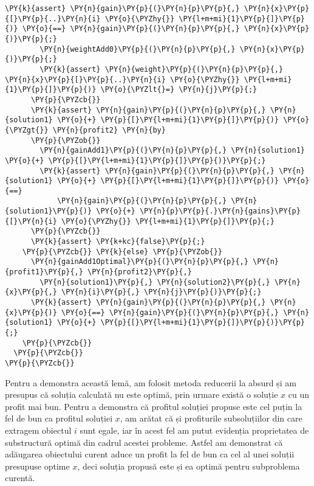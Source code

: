 \begin{sloppypar}
\begin{Verbatim}[commandchars=\\\{\}]
        \PY{k}{assert} \PY{n}{gain}\PY{p}{(}\PY{n}{p}\PY{p}{,} \PY{n}{x}\PY{p}{[}\PY{p}{..}\PY{n}{i} \PY{o}{\PYZhy{}} \PY{l+m+mi}{1}\PY{p}{]}\PY{p}{)} \PY{o}{==} \PY{n}{gain}\PY{p}{(}\PY{n}{p}\PY{p}{,} \PY{n}{x}\PY{p}{)}\PY{p}{;}
        \PY{n}{weightAdd0}\PY{p}{(}\PY{n}{p}\PY{p}{,} \PY{n}{x}\PY{p}{)}\PY{p}{;}
        \PY{k}{assert} \PY{n}{weight}\PY{p}{(}\PY{n}{p}\PY{p}{,} \PY{n}{x}\PY{p}{[}\PY{p}{..}\PY{n}{i} \PY{o}{\PYZhy{}} \PY{l+m+mi}{1}\PY{p}{]}\PY{p}{)} \PY{o}{\PYZlt{}=} \PY{n}{j}\PY{p}{;}
      \PY{p}{\PYZcb{}}
      \PY{k}{assert} \PY{n}{gain}\PY{p}{(}\PY{n}{p}\PY{p}{,} \PY{n}{solution1} \PY{o}{+} \PY{p}{[}\PY{l+m+mi}{1}\PY{p}{]}\PY{p}{)} \PY{o}{\PYZgt{}} \PY{n}{profit2} \PY{n}{by} 
      \PY{p}{\PYZob{}}
        \PY{n}{gainAdd1}\PY{p}{(}\PY{n}{p}\PY{p}{,} \PY{n}{solution1} \PY{o}{+} \PY{p}{[}\PY{l+m+mi}{1}\PY{p}{]}\PY{p}{)}\PY{p}{;}
        \PY{k}{assert} \PY{n}{gain}\PY{p}{(}\PY{n}{p}\PY{p}{,} \PY{n}{solution1} \PY{o}{+} \PY{p}{[}\PY{l+m+mi}{1}\PY{p}{]}\PY{p}{)} \PY{o}{==} 
            \PY{n}{gain}\PY{p}{(}\PY{n}{p}\PY{p}{,} \PY{n}{solution1}\PY{p}{)} \PY{o}{+} \PY{n}{p}\PY{p}{.}\PY{n}{gains}\PY{p}{[}\PY{n}{i} \PY{o}{\PYZhy{}} \PY{l+m+mi}{1}\PY{p}{]}\PY{p}{;}
      \PY{p}{\PYZcb{}}
      \PY{k}{assert} \PY{k+kc}{false}\PY{p}{;} 
    \PY{p}{\PYZcb{}} \PY{k}{else} \PY{p}{\PYZob{}}
      \PY{n}{gainAdd1Optimal}\PY{p}{(}\PY{n}{p}\PY{p}{,} \PY{n}{profit1}\PY{p}{,} \PY{n}{profit2}\PY{p}{,} 
        \PY{n}{solution1}\PY{p}{,} \PY{n}{solution2}\PY{p}{,} \PY{n}{x}\PY{p}{,} \PY{n}{i}\PY{p}{,} \PY{n}{j}\PY{p}{)}\PY{p}{;}
      \PY{k}{assert} \PY{n}{gain}\PY{p}{(}\PY{n}{p}\PY{p}{,} \PY{n}{x}\PY{p}{)} \PY{o}{==} \PY{n}{gain}\PY{p}{(}\PY{n}{p}\PY{p}{,} \PY{n}{solution1} \PY{o}{+} \PY{p}{[}\PY{l+m+mi}{1}\PY{p}{]}\PY{p}{)}\PY{p}{;}
    \PY{p}{\PYZcb{}}
  \PY{p}{\PYZcb{}}
\PY{p}{\PYZcb{}}
\end{Verbatim}
\hspace{4mm} Pentru a demonstra această lemă, am folosit metoda reducerii la absurd și am presupus că soluția calculată nu este optimă, prin urmare există o soluție $x$ cu un profit mai bun. Pentru a demonstra că profitul soluției propuse este cel puțin la fel de bun ca profitul soluției $x$, am arătat că și profiturile subsoluțiilor din care extragem obiectul $i$ sunt egale, iar în acest fel am putut evidenția proprietatea de substructură optimă din cadrul acestei probleme. Astfel am demonstrat că adăugarea obiectului curent aduce un profit la fel de bun ca cel al unei soluții presupuse optime $x$, deci soluția propusă este și ea optimă pentru subproblema curentă. \par

\end{sloppypar}
